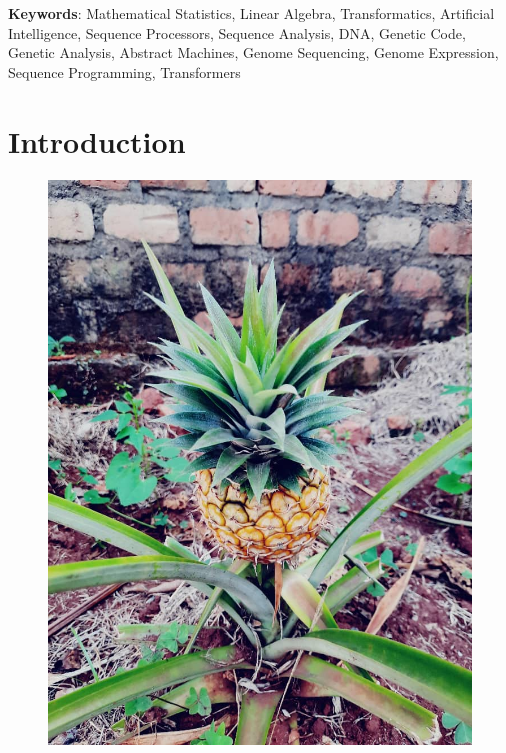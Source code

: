 \documentclass[a4paper, 18pt]{book} %
\begin{document}
     \newline\newline
     \textbf{Keywords}: Mathematical Statistics, Linear Algebra, Transformatics, Artificial Intelligence, Sequence Processors, Sequence Analysis, DNA, Genetic Code, Genetic Analysis, Abstract Machines, Genome Sequencing, Genome Expression, Sequence Programming, Transformers

\newpage

\chapter{Introduction}
\label{SEC1}


\begin{figure}[H]
  \begin{center}
   \includegraphics[height=0.6\textheight,]{resources/images/the_pineapple.jpg}\\

\end{center}
\end{figure}
\end{document}
